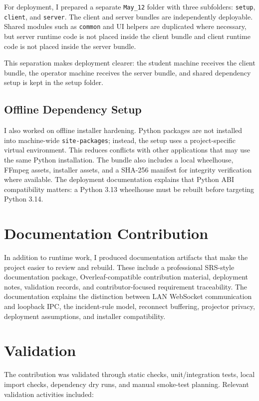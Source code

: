 \documentclass[conference]{IEEEtran}
\begin{document}
For deployment, I prepared a separate \texttt{May\_12} folder with three subfolders: \texttt{setup}, \texttt{client}, and \texttt{server}. The client and server bundles are independently deployable. Shared modules such as \texttt{common} and UI helpers are duplicated where necessary, but server runtime code is not placed inside the client bundle and client runtime code is not placed inside the server bundle.

This separation makes deployment clearer: the student machine receives the client bundle, the operator machine receives the server bundle, and shared dependency setup is kept in the setup folder.

\subsection{Offline Dependency Setup}

I also worked on offline installer hardening. Python packages are not installed into machine-wide \texttt{site-packages}; instead, the setup uses a project-specific virtual environment. This reduces conflicts with other applications that may use the same Python installation. The bundle also includes a local wheelhouse, FFmpeg assets, installer assets, and a SHA-256 manifest for integrity verification where available. The deployment documentation explains that Python ABI compatibility matters: a Python 3.13 wheelhouse must be rebuilt before targeting Python 3.14.

\section{Documentation Contribution}

In addition to runtime work, I produced documentation artifacts that make the project easier to review and rebuild. These include a professional SRS-style documentation package, Overleaf-compatible contribution material, deployment notes, validation records, and contributor-focused requirement traceability. The documentation explains the distinction between LAN WebSocket communication and loopback IPC, the incident-rule model, reconnect buffering, projector privacy, deployment assumptions, and installer compatibility.

\section{Validation}

The contribution was validated through static checks, unit/integration tests, local import checks, dependency dry runs, and manual smoke-test planning. Relevant validation activities included:
\end{document}
